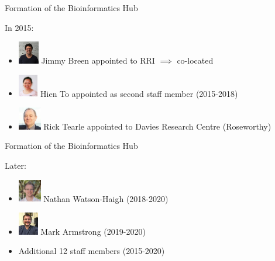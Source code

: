\documentclass[11pt]{beamer}
\begin{document}
\begin{frame}{Formation of the Bioinformatics Hub}

In 2015:\\[5mm]

	\begin{itemize}
		\item \includegraphics[height=1cm]{figures/Jimmy.jpg} Jimmy Breen appointed to RRI $\implies$ co-located
		\item \includegraphics[height=1cm]{figures/hien.jpg} Hien To appointed as second staff member (2015-2018)
		\item \includegraphics[height=1cm]{figures/rick.jpeg} Rick Tearle appointed to Davies Research Centre (Roseworthy)\\[8mm]
	\end{itemize}		
	
\end{frame}

\begin{frame}{Formation of the Bioinformatics Hub}

Later:\\[5mm]

	\begin{itemize}
		\item \includegraphics[height=1cm]{figures/Watson-Haigh.jpeg} Nathan Watson-Haigh (2018-2020) 
		\item \includegraphics[height=1cm]{figures/Mark.jpg}  Mark Armstrong (2019-2020)
		\item Additional 12 staff members (2015-2020)
	\end{itemize}
	~\\[1cm]
	
\end{frame}
\end{document}
